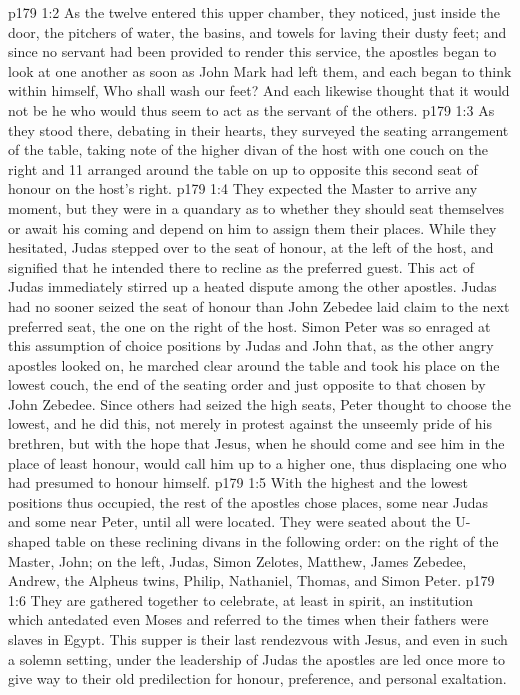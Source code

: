 \vs p179 1:2 As the twelve entered this upper chamber, they noticed, just inside the door, the pitchers of water, the basins, and towels for laving their dusty feet; and since no servant had been provided to render this service, the apostles began to look at one another as soon as John Mark had left them, and each began to think within himself, Who shall wash our feet? And each likewise thought that it would not be he who would thus seem to act as the servant of the others.
\vs p179 1:3 As they stood there, debating in their hearts, they surveyed the seating arrangement of the table, taking note of the higher divan of the host with one couch on the right and 11 arranged around the table on up to opposite this second seat of honour on the host’s right.
\vs p179 1:4 They expected the Master to arrive any moment, but they were in a quandary as to whether they should seat themselves or await his coming and depend on him to assign them their places. While they hesitated, Judas stepped over to the seat of honour, at the left of the host, and signified that he intended there to recline as the preferred guest. This act of Judas immediately stirred up a heated dispute among the other apostles. Judas had no sooner seized the seat of honour than John Zebedee laid claim to the next preferred seat, the one on the right of the host. Simon Peter was so enraged at this assumption of choice positions by Judas and John that, as the other angry apostles looked on, he marched clear around the table and took his place on the lowest couch, the end of the seating order and just opposite to that chosen by John Zebedee. Since others had seized the high seats, Peter thought to choose the lowest, and he did this, not merely in protest against the unseemly pride of his brethren, but with the hope that Jesus, when he should come and see him in the place of least honour, would call him up to a higher one, thus displacing one who had presumed to honour himself.
\vs p179 1:5 With the highest and the lowest positions thus occupied, the rest of the apostles chose places, some near Judas and some near Peter, until all were located. They were seated about the U\hyp{}shaped table on these reclining divans in the following order: on the right of the Master, John; on the left, Judas, Simon Zelotes, Matthew, James Zebedee, Andrew, the Alpheus twins, Philip, Nathaniel, Thomas, and Simon Peter.
\vs p179 1:6 \pc They are gathered together to celebrate, at least in spirit, an institution which antedated even Moses and referred to the times when their fathers were slaves in Egypt. This supper is their last rendezvous with Jesus, and even in such a solemn setting, under the leadership of Judas the apostles are led once more to give way to their old predilection for honour, preference, and personal exaltation.
